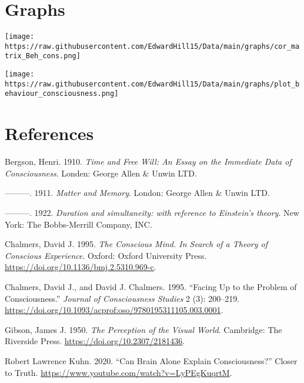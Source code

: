 \documentclass[
]{article}
\newlength{\cslhangindent}
\newlength{\cslentryspacingunit} %
\newenvironment{CSLReferences}[2] %
 {%
  \setlength{\parindent}{0pt}
  \ifodd #1
  \let\oldpar\par
  \def\par{\hangindent=\cslhangindent\oldpar}
  \fi
  \setlength{\parskip}{#2\cslentryspacingunit}
 }%
 {}
\begin{document}
\hypertarget{graphs}{%
\section{\texorpdfstring{\textbf{Graphs}}{Graphs}}\label{graphs}}

\texttt{[image: https://raw.githubusercontent.com/EdwardHill15/Data/main/graphs/cor\_matrix\_Beh\_cons.png]}

\texttt{[image: https://raw.githubusercontent.com/EdwardHill15/Data/main/graphs/plot\_behaviour\_consciousness.png]}

\hypertarget{references}{%
\section*{References}\label{references}}

\hypertarget{refs}{}
\begin{CSLReferences}{1}{0}
\leavevmode{}%
Bergson, Henri. 1910. \emph{{Time and Free Will: An Essay on the
Immediate Data of Consciousness}}. Londen: George Allen \& Unwin LTD.

\leavevmode{}%
---------. 1911. \emph{{Matter and Memory}}. London: George Allen \&
Unwin LTD.

\leavevmode{}%
---------. 1922. \emph{{Duration and simultaneity: with reference to
Einstein's theory}}. New York: The Bobbs-Merrill Company, INC.

\leavevmode{}%
Chalmers, David J. 1995. \emph{{The Conscious Mind. In Search of a
Theory of Conscious Experience}}. Oxford: Oxford University Press.
\url{https://doi.org/10.1136/bmj.2.5310.969-c}.

\leavevmode{}%
Chalmers, David J., and David J. Chalmers. 1995. {``{Facing Up to the
Problem of Consciousness}.''} \emph{Journal of Consciousness Studies} 2
(3): 200--219.
\url{https://doi.org/10.1093/acprof:oso/9780195311105.003.0001}.

\leavevmode{}%
Gibson, James J. 1950. \emph{{The Perception of the Visual World}}.
Cambridge: The Riverside Press. \url{https://doi.org/10.2307/2181436}.

\leavevmode{}%
Robert Lawrence Kuhn. 2020. {``{Can Brain Alone Explain
Consciousness?}''} Closer to Truth.
\url{https://www.youtube.com/watch?v=LyPEgKuqrtM}.

\end{CSLReferences}
\end{document}

